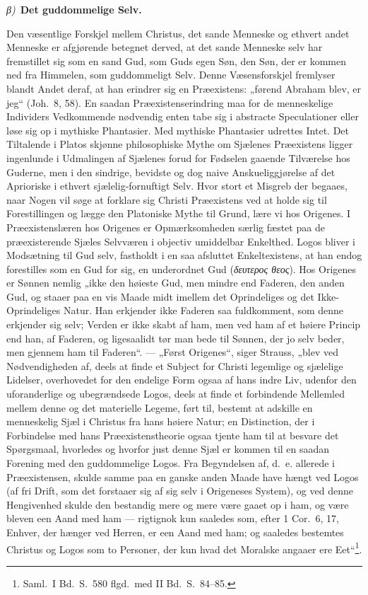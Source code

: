 \documentclass[12pt]{book}
\newcommand{\greekrun}[2]{%
  \medskip\begin{center}{\itshape #1)}\ {\bfseries #2}\end{center}\medskip}
\begin{document}
\greekrun{β}{Det guddommelige Selv.}

Den væsentlige Forskjel mellem Christus, det sande Menneske og
ethvert andet Menneske er afgjørende betegnet derved, at det sande
Menneske selv har fremstillet sig som en sand Gud, som Guds egen Søn,
den Søn, der er kommen ned fra Himmelen, som guddommeligt Selv. Denne
Væsensforskjel fremlyser blandt Andet deraf, at han erindrer sig en
Præexistens: „førend Abraham blev, er jeg“ (Joh.\ 8, 58). En saadan
Præexistenserindring maa for de menneskelige Individers Vedkommende
nødvendig enten tabe sig i abstracte Speculationer eller løse sig op
i mythiske Phantasier. Med mythiske Phantasier udrettes Intet. Det
Tiltalende i Platos skjønne philosophiske Mythe om Sjælenes
Præexistens ligger ingenlunde i Udmalingen af Sjælenes forud for
Fødselen gaaende Tilværelse hos Guderne, men i den sindrige, bevidste
og dog naive Anskueliggjørelse af det Aprioriske i ethvert
sjælelig-fornuftigt Selv. Hvor stort et Misgreb der begaaes, naar
Nogen vil søge at forklare sig Christi Præexistens ved at holde sig
til Forestillingen og lægge den Platoniske Mythe til Grund, lære vi
hos Origenes. I Præexistenslæren hos Origenes er Opmærksomheden
særlig fæstet paa de præexisterende Sjæles Selvværen i objectiv
umiddelbar Enkelthed. Logos bliver i Modsætning til Gud selv,
fastholdt i en saa afsluttet Enkeltexistens, at han endog forestilles
som en Gud for sig, en underordnet Gud (\textit{δευτερος θεος}). Hos
Origenes er Sønnen nemlig „ikke den høieste Gud, men mindre end
Faderen, den anden Gud, og staaer paa en vis Maade midt imellem det
Oprindeliges og det Ikke-Oprindeliges Natur. Han erkjender ikke
Faderen saa
fuldkomment, som denne erkjender sig selv; Verden er ikke skabt af
ham, men ved ham af et høiere Princip end han, af Faderen, og
ligesaalidt tør man bede til Sønnen, der jo selv beder, men gjennem
ham til Faderen“. --- „Først Origenes“, siger Strauss, „blev ved
Nødvendigheden af, deels at finde et Subject for Christi legemlige og
sjælelige Lidelser, overhovedet for den endelige Form ogsaa af hans
indre Liv, udenfor den uforanderlige og ubegrændsede Logos, deels at
finde et forbindende Mellemled mellem denne og det materielle Legeme,
ført til, bestemt at adskille en menneskelig Sjæl i Christus fra hans
høiere Natur; en Distinction, der i Forbindelse med hans
Præexistenstheorie ogsaa tjente ham til at besvare det Spørgsmaal,
hvorledes og hvorfor just denne Sjæl er kommen til en saadan Forening
med den guddommelige Logos. Fra Begyndelsen af, d.\ e. allerede i
Præexistensen, skulde samme paa en ganske anden Maade have hængt ved
Logos (af fri Drift, som det forstaaer sig af sig selv i Origeneses
System), og ved denne Hengivenhed skulde den bestandig mere og mere
være gaaet op i ham, og være bleven een Aand med ham --- rigtignok
kun saaledes som, efter 1 Cor.\ 6, 17, Enhver, der hænger ved Herren,
er een Aand med ham; og saaledes bestemtes Christus og Logos som to
Personer, der kun hvad det Moralske angaaer ere
Eet“\footnote{Saml.\ I Bd.\ S.\ 580 flgd.\ med II Bd.\ S.\ 84--85.}.
\end{document}
